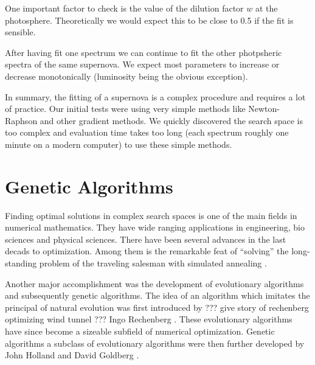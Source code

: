 One important factor to check is the value of the dilution factor $w$ at the photosphere. Theoretically we would expect this to be close to 0.5 if the fit is sensible. 

After having fit one spectrum we can continue to fit the other photpsheric spectra of the same supernova. We expect most parameters to increase or decrease monotonically (luminosity being the obvious exception). 

In summary, the fitting of a supernova is a complex procedure and requires a lot of practice. Our initial tests were using very simple methods like Newton-Raphson and other gradient methods. We quickly discovered the search space is too complex and evaluation time takes too long (each spectrum roughly one minute on a modern computer) to use these simple methods. 

 
\section{Genetic Algorithms}
\label{sec:intro_ga}

Finding optimal solutions in complex search spaces is one of the main fields in numerical mathematics.  They have wide ranging applications in engineering, bio sciences and physical sciences. There have been several advances in the last decads to optimization. 
Among them is the  remarkable feat of ``solving'' the long-standing problem of the traveling salesman with simulated annealing \citep{Kirkpatrick13051983}.

\cite{Holland:1962:OLT:321127.321128}
Another major accomplishment was the development of evolutionary algorithms and subsequently genetic algorithms. The idea of an algorithm which imitates the principal of natural evolution was first introduced by ??? give story of rechenberg optimizing wind tunnel ??? Ingo Rechenberg \citep{Rechenberg1973}. These evolutionary algorithms have since become a sizeable subfield of numerical optimization. Genetic algorithms a subclass of evolutionary algorithms were then further developed by John Holland and David Goldberg \citep{citeulike:125978}.

